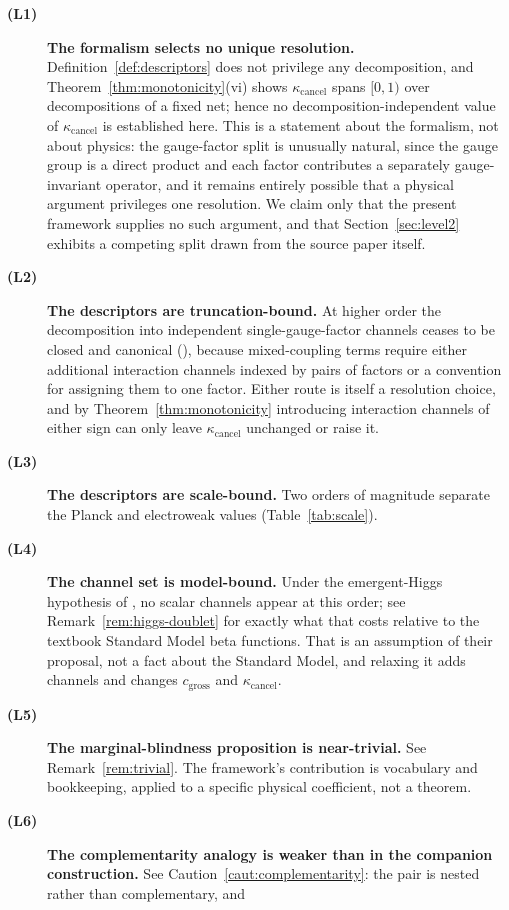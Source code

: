 \documentclass[11pt]{article}
\theoremstyle{definition}
\theoremstyle{remark}
\newcommand{\gross}{c_{\mathrm{gross}}}
\newcommand{\kcancel}{\kappa_{\mathrm{cancel}}}
\begin{document}
\begin{description}
\item[\textbf{(L1)}] \textbf{The formalism selects no unique resolution.}
Definition~\ref{def:descriptors} does not
privilege any decomposition, and Theorem~\ref{thm:monotonicity}(vi) shows $\kcancel$ spans $[0,1)$
over decompositions of a fixed net; hence no decomposition-independent value of $\kcancel$ is
established here. This is a statement about the formalism, not about physics: the gauge-factor
split is unusually natural, since the gauge group is a direct product and each factor contributes a
separately gauge-invariant operator, and it remains entirely possible that a physical argument
privileges one resolution. We claim only that the present framework supplies no such argument, and
that Section~\ref{sec:level2} exhibits a competing split drawn from the source paper itself.
\item[\textbf{(L2)}] \textbf{The descriptors are truncation-bound.} At higher order the decomposition into
independent single-gauge-factor channels ceases to be closed and canonical
(\citealp{MachacekVaughn1983,Mihaila2012}), because mixed-coupling terms require either additional
interaction channels indexed by pairs of factors or a convention for assigning them to one factor.
Either route is itself a resolution choice, and by Theorem~\ref{thm:monotonicity} introducing
interaction channels of either sign can only leave $\kcancel$ unchanged or raise it.
\item[\textbf{(L3)}] \textbf{The descriptors are scale-bound.} Two orders of magnitude separate the Planck and
electroweak values (Table~\ref{tab:scale}).
\item[\textbf{(L4)}] \textbf{The channel set is model-bound.} Under the emergent-Higgs hypothesis of
\citet{TurokBoyle2023}, no scalar channels appear at this order; see Remark~\ref{rem:higgs-doublet}
for exactly what that costs relative to the textbook Standard Model beta functions. That is an
assumption of their proposal, not a fact about the Standard Model, and relaxing it adds channels
and changes $\gross$ and $\kcancel$.
\item[\textbf{(L5)}] \textbf{The marginal-blindness proposition is near-trivial.} See Remark~\ref{rem:trivial}. The
framework's contribution is vocabulary and bookkeeping, applied to a specific physical coefficient,
not a theorem.
\item[\textbf{(L6)}] \textbf{The complementarity analogy is weaker than in the companion construction.} See
Caution~\ref{caut:complementarity}: the pair is nested rather than complementary, and

\end{description}
\end{document}
